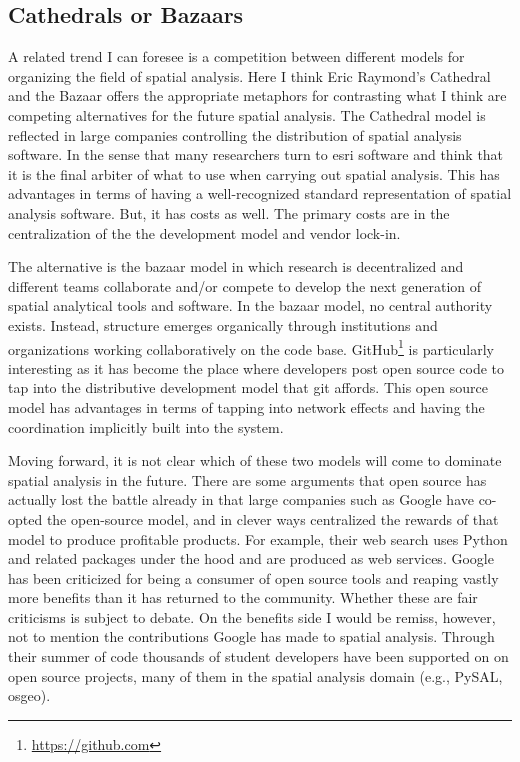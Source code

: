 \documentclass[11pt]{article}
\begin{document}
\subsection{Cathedrals or Bazaars}
\label{sec:orgbb69af0}
A related trend I can foresee is a competition between different models for
organizing the field of spatial analysis. Here I think Eric Raymond's Cathedral
and the Bazaar \cite{raymond_cathedral_1999-2} offers the appropriate
metaphors for contrasting what I think are competing alternatives for the
future spatial analysis. The Cathedral model is reflected in large companies
controlling the distribution of spatial analysis software. In the sense that
many researchers turn to esri software and think that it is the final arbiter
of what to use when carrying out spatial analysis. This has advantages in terms
of having a well-recognized standard representation of spatial analysis
software. But, it has costs as well. The primary costs are in the
centralization of the the development model and vendor lock-in.

The alternative is the bazaar model in which research is decentralized and
different teams collaborate and/or compete to develop the next generation of
spatial analytical tools and software. In the bazaar model, no central authority
exists. Instead, structure emerges organically through institutions and
organizations working collaboratively on the code base. 
GitHub\footnote{\url{https://github.com}} is particularly interesting as it has
become the place where developers post open source code to tap into the
distributive development model that git affords. This open source model has
advantages in terms of tapping into network effects and having the coordination
implicitly built into the system.

Moving forward, it is not clear which of these two models will come to dominate
spatial analysis in the future. There are some arguments that open source has
actually lost the battle already \cite{Mark_2018} in that large companies such
as Google have co-opted the open-source model, and in clever ways centralized the
rewards of that model to produce profitable products. For example, their
web search uses Python and related packages under the hood and are produced as
web services. Google has been criticized for being a consumer of open source
tools and reaping vastly more benefits than it has returned to the community.
Whether these are fair criticisms is subject to debate. On the benefits
side I would be remiss, however, not to mention the contributions Google has
made to spatial analysis. Through their summer of code thousands of student
developers have been supported on on open source projects, many of them in the
spatial analysis domain (e.g., PySAL, osgeo).
\end{document}
